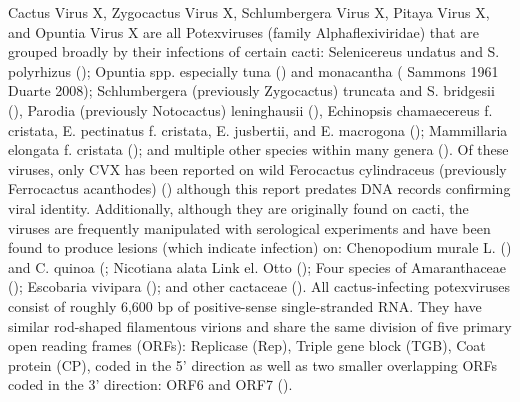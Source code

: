 \documentclass[11pt,letterpaper,titlepage]{article}
\begin{document}
\begin{linenumbers}

Cactus Virus X, Zygocactus Virus X, Schlumbergera Virus X, Pitaya Virus X, and Opuntia Virus X are all Potexviruses (family Alphaflexiviridae) that are grouped broadly by their infections of certain cacti: Selenicereus undatus and S. polyrhizus (\cite{li_viral_2015, peng_molecular_2016}); Opuntia spp. especially tuna (\cite{koenig_molecular_2004, duarte_potexvirus_2008}) and monacantha (\cite{attathom_occurrence_1978} Sammons 1961 Duarte 2008); Schlumbergera (previously Zygocactus) truncata and S. bridgesii  (\cite{duarte_potexvirus_2008, koenig_molecular_2004}), Parodia (previously Notocactus) leninghausii (\cite{park_detection_2018}),  Echinopsis chamaecereus f. cristata, E. pectinatus f. cristata, E. jusbertii, and E. macrogona (\cite{maliarenko_cactus_2013}); Mammillaria elongata f. cristata (\cite{maliarenko_cactus_2013}); and multiple other species within many genera (\cite{evallo_brief_2021}). 
Of these viruses, only CVX has been reported on wild Ferocactus cylindraceus (previously Ferrocactus acanthodes) (\cite{attathom_occurrence_1978}) although this report predates DNA records confirming viral identity. 
Additionally, although they are originally found on cacti, the viruses are frequently manipulated with serological experiments and have been found to produce lesions (which indicate infection) on: Chenopodium murale L. (\cite{maliarenko_cactus_2013}) and C. quinoa (\cite{attathom_identification_1978,attathom_occurrence_1978, brandes_untersuchungen_1963-1}; Nicotiana alata Link el. Otto (\cite{maliarenko_cactus_2013}); Four species of Amaranthaceae (\cite{attathom_identification_1978}); Escobaria vivipara (\cite{attathom_identification_1978}); and other cactaceae (\cite{attathom_identification_1978}). 
All cactus-infecting potexviruses consist of roughly 6,600 bp of positive-sense single-stranded RNA. They have similar rod-shaped filamentous virions and share the same division of five primary open reading frames (ORFs): Replicase (Rep), Triple gene block (TGB), Coat protein (CP), coded in the 5' direction as well as two smaller overlapping ORFs coded in the 3' direction: ORF6 and ORF7 (\cite{evallo_brief_2021,liou_complete_2004, martelli_family_2007}). 

\end{linenumbers}
\end{document}
